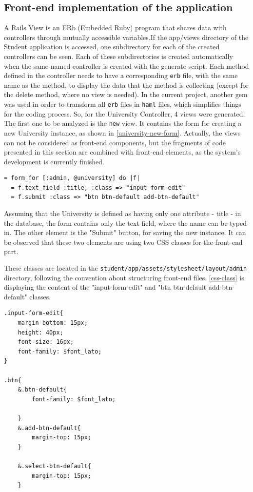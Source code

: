 \subsection{Front-end implementation of the application}
A Rails View is an ERb (Embedded Ruby) program that shares data with controllers through mutually accessible variables.If the app/views directory of the Student application is accessed, one subdirectory for each of the created controllers can be seen. Each of these subdirectories is created automatically when the same-named controller is created with the generate script. Each method defined in the controller needs to have a corresponding \texttt{erb} file, with the same name as the method, to display the data that the method is collecting (except for the delete method, where no view is needed). In the current project, another gem was used in order to transform all \texttt{erb} files in \texttt{haml} files, which simplifies things for the coding process. So, for the University Controller, 4 views were generated. The first one to be analyzed is the \texttt{new} view. It contains the form for creating a new University instance, as shown in \autoref{university-new-form}. Actually, the views can not be considered as front-end components, but the fragments of code presented in this section are combined with front-end elements, as the system's development is currently finished. 

\begin{lstlisting}[caption={Form for creating a new University},label={university-new-form}]
= form_for [:admin, @university] do |f|
  = f.text_field :title, :class => "input-form-edit"
  = f.submit :class => "btn btn-default add-btn-default"
\end{lstlisting}
\bigskip

 Assuming that the University is defined as having only one attribute - title - in the database, the form contains only the text field, where the name can be typed in. The other element is the "Submit" button, for saving the new instance. It can be observed that these two elements are using two CSS classes for the front-end part. 
 
These classes are located in the \texttt{student/app/assets/stylesheet/layout/admin} directory, following the convention about structuring front-end files. \autoref{css-class} is displaying the content of the "input-form-edit" and  "btn btn-default add-btn-default" classes.
 
 \begin{lstlisting}[caption={CSS classes for the University instance},label={css-class}]
.input-form-edit{
	margin-bottom: 15px; 
	height: 40px;
	font-size: 16px;
	font-family: $font_lato;
}

.btn{
	&.btn-default{
		font-family: $font_lato;

	}
	&.add-btn-default{
		margin-top: 15px;
	}

	&.select-btn-default{
		margin-top: 15px;
	}
\end{lstlisting}
\bigskip

